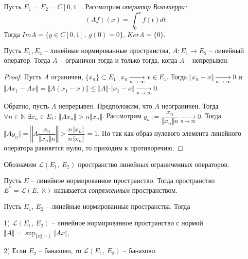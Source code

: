 \begin{example}
Пусть $\displaystyle E_{1} =E_{2} =C[ 0,1]$. Рассмотрим \textit{оператор Вольтерра}\textit{:}
\begin{equation*}
( Af)( x) =\int _{0}^{x} f( t) dt.
\end{equation*}
Тогда $\displaystyle ImA=\{g\in C[ 0,1] ,\ g( 0) =0\}$, $\displaystyle KerA=\{0\}$.
\end{example}
\begin{theorem}
Пусть $\displaystyle E_{1} ,E_{2}$ -- линейные нормированные пространства, $\displaystyle A:E_{1}\rightarrow E_{2}$ -- линейный оператор. Тогда $\displaystyle A$ -- ограничен тогда и только тогда, когда $\displaystyle A$ -- непрерывен.
\end{theorem}
\begin{proof}
Пусть $\displaystyle A$ ограничен, $\displaystyle \{x_{n}\} \subset E_{1} :\ x_{n}\xrightarrow[n\rightarrow \infty ]{} x\in E_{1}$. Тогда $\displaystyle \Vert x_{n} -x\Vert \xrightarrow[n\rightarrow \infty ]{} 0$ и $\displaystyle \Vert Ax_{1} -Ax\Vert =\Vert A( x_{1} -x)\Vert \leqslant \Vert A\Vert \cdotp \Vert x_{1} -x\Vert \xrightarrow[n\rightarrow \infty ]{} 0$.

Обратно, пусть $\displaystyle A$ непрерывен. Предположим, что $\displaystyle A$ неограничен. Тогда $\displaystyle \forall n\in \mathbb{N} \ \exists x_{n} \in E_{1} :\ \Vert Ax_{n}\Vert  >n\Vert x_{n}\Vert $. Рассмотрим $\displaystyle y_{n} :=\dfrac{x_{n}}{\Vert x_{n}\Vert n}\xrightarrow[n\rightarrow \infty ]{} 0$. Тогда $\displaystyle \Vert Ay_{n}\Vert =\left\Vert A\dfrac{x_{n}}{\Vert x_{n}\Vert n}\right\Vert  >\dfrac{n\Vert x_{n}\Vert }{n\Vert x_{n}\Vert } =1$. Но так как образ нулевого элемента линейного оператора равняется нулю, то приходим к противоречию.
\end{proof}
\begin{definition}
Обозначим $\displaystyle \mathcal{L}( E_{1} ,\ E_{2})$ пространство линейных ограниченных операторов.
\end{definition}
\begin{definition}
Пусть $\displaystyle E$ -- линейное нормированное пространство. Тогда пространство $\displaystyle E^{*} =\mathcal{L}( E,\ \mathbb{K})$  называется \textit{сопряженным} пространством.
\end{definition}
\begin{theorem}
Пусть $\displaystyle E_{1} ,\ E_{2}$ -- линейные нормированные пространства. Тогда

1) $\displaystyle \mathcal{L}( E_{1} ,\ E_{2})$ -- линейное нормированное пространство с нормой $\displaystyle \Vert A\Vert =\sup _{\Vert x\Vert =1}\Vert Ax\Vert $,

2) Если $\displaystyle E_{2}$ -- банахово, то $\displaystyle \mathcal{L}( E_{1} ,\ E_{2})$ -- банахово.
\end{theorem}
